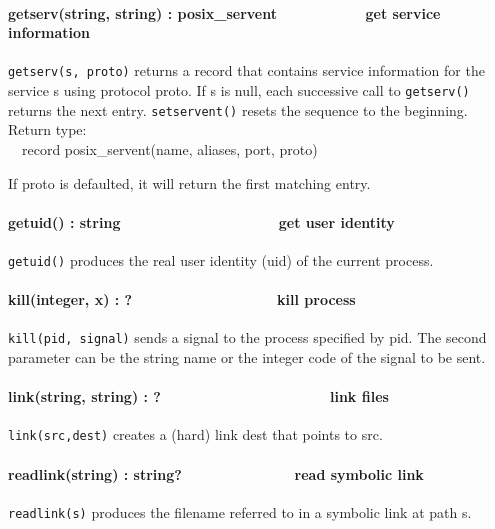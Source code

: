 \paragraph[getserv(string, string) : posix\_servent\ \ \ \ \ \ 
\ \ \ \ \ get service information]{getserv(string, string) :
posix\_servent\ \ \ \ \ \  \ \ \ \ \ get service information}
\texttt{getserv(s, proto)} returns a record that contains service information for
the service s using protocol proto. If s is null, each successive call
to \texttt{getserv()} returns the next entry. \texttt{setservent()} resets the sequence
to the beginning. Return type:\\
\ \ record posix\_servent(name, aliases, port, proto) 

If proto is defaulted, it will return the first matching entry. 

\paragraph[getuid() : string \ \ \ \ \ \ \ \ \ \ \ \ \ \  \ \ \ \ \ get
user identity]{getuid() : string \ \ \ \ \ \ \ \ \ \ \ \ \ \ 
\ \ \ \ \ get user identity}
\texttt{getuid()} produces the real user identity (uid) of the current process. 

\paragraph[kill(integer, x) : ?\ \ \ \ \ \ \ \ \ \ \ \ \ \ \ \  \ \ kill
process]{kill(integer, x) : ?\ \ \ \ \ \ \ \ \ \ \ \ \ \ \ \  \ \ kill
process}
\texttt{kill(pid, signal)} sends a signal to the process specified by pid. The
second parameter can be the string name or the integer code of the
signal to be sent.

\paragraph[link(string, string) : ?\ \ \ \ \ \ \ \ \ \ \ \ \ \ 
\ \ \ \ \ \ \ link files]{link(string, string) :
?\ \ \ \ \ \ \ \ \ \ \ \ \ \  \ \ \ \ \ \ \ link files}
\index{link!file system}\texttt{link(src,dest)} creates a (hard) link dest that
points to src.

\paragraph[readlink(string) : string?\ \ \ \ \ \ \ \ \ \ \ \  \ \ read
symbolic link]{readlink(string) : string?\ \ \ \ \ \ \ \ \ \ \ \ 
\ \ read symbolic link}
\texttt{readlink(s)} produces the filename referred to in a symbolic link at path
s.

